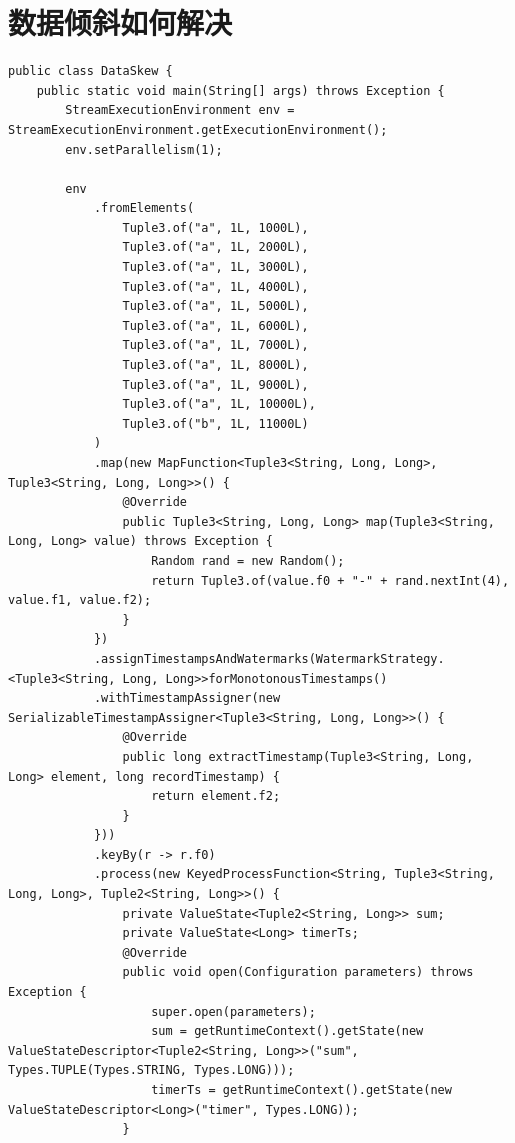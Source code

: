 \documentclass[cn,11pt,chinese]{elegantbook}
\begin{document}
\section{数据倾斜如何解决}

\begin{verbatim}
public class DataSkew {
    public static void main(String[] args) throws Exception {
        StreamExecutionEnvironment env = StreamExecutionEnvironment.getExecutionEnvironment();
        env.setParallelism(1);

        env
            .fromElements(
                Tuple3.of("a", 1L, 1000L),
                Tuple3.of("a", 1L, 2000L),
                Tuple3.of("a", 1L, 3000L),
                Tuple3.of("a", 1L, 4000L),
                Tuple3.of("a", 1L, 5000L),
                Tuple3.of("a", 1L, 6000L),
                Tuple3.of("a", 1L, 7000L),
                Tuple3.of("a", 1L, 8000L),
                Tuple3.of("a", 1L, 9000L),
                Tuple3.of("a", 1L, 10000L),
                Tuple3.of("b", 1L, 11000L)
            )
            .map(new MapFunction<Tuple3<String, Long, Long>, Tuple3<String, Long, Long>>() {
                @Override
                public Tuple3<String, Long, Long> map(Tuple3<String, Long, Long> value) throws Exception {
                    Random rand = new Random();
                    return Tuple3.of(value.f0 + "-" + rand.nextInt(4), value.f1, value.f2);
                }
            })
            .assignTimestampsAndWatermarks(WatermarkStrategy.<Tuple3<String, Long, Long>>forMonotonousTimestamps()
            .withTimestampAssigner(new SerializableTimestampAssigner<Tuple3<String, Long, Long>>() {
                @Override
                public long extractTimestamp(Tuple3<String, Long, Long> element, long recordTimestamp) {
                    return element.f2;
                }
            }))
            .keyBy(r -> r.f0)
            .process(new KeyedProcessFunction<String, Tuple3<String, Long, Long>, Tuple2<String, Long>>() {
                private ValueState<Tuple2<String, Long>> sum;
                private ValueState<Long> timerTs;
                @Override
                public void open(Configuration parameters) throws Exception {
                    super.open(parameters);
                    sum = getRuntimeContext().getState(new ValueStateDescriptor<Tuple2<String, Long>>("sum", Types.TUPLE(Types.STRING, Types.LONG)));
                    timerTs = getRuntimeContext().getState(new ValueStateDescriptor<Long>("timer", Types.LONG));
                }


\end{verbatim}
\end{document}
